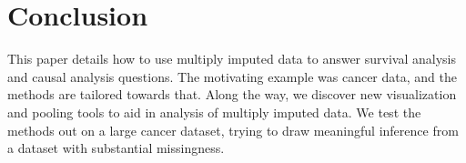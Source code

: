 \chapter{Conclusion}
This paper details how to use multiply imputed data to answer survival analysis and causal analysis questions. The motivating example was cancer data, and the methods are tailored towards that. Along the way, we discover new visualization and pooling tools to aid in analysis of multiply imputed data. We test the methods out on a large cancer dataset, trying to draw meaningful inference from a dataset with substantial missingness.
 

